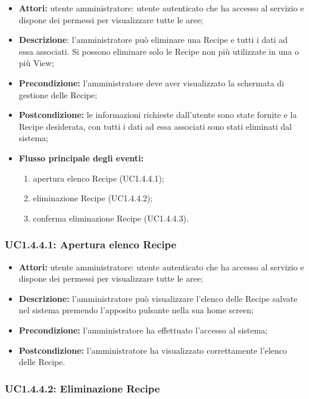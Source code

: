 \begin{itemize}
  	\item \textbf{Attori:} utente amministratore: utente autenticato che ha accesso al servizio e dispone dei permessi per visualizzare tutte le aree;
    \item \textbf{Descrizione}: l'amministratore può eliminare una Recipe e tutti i dati ad essa associati.
    Si possono eliminare solo le Recipe non più utilizzate in una o più View;
    \item \textbf{Precondizione:} l'amministratore deve aver visualizzato la schermata di gestione delle Recipe;
    \item \textbf{Postcondizione:} le informazioni richieste dall'utente sono state fornite e la Recipe desiderata, con tutti i dati ad essa associati sono stati eliminati dal sistema;
    \item \textbf{Flusso principale degli eventi:}
    \begin{enumerate}
        \item apertura elenco Recipe (UC1.4.4.1);
        \item eliminazione Recipe (UC1.4.4.2);
        \item conferma eliminazione Recipe (UC1.4.4.3).
    \end{enumerate}
\end{itemize}

\subsubsection{UC1.4.4.1: Apertura elenco Recipe}

\begin{itemize}
  	\item \textbf{Attori:} utente amministratore: utente autenticato che ha accesso al servizio e dispone dei permessi per visualizzare tutte le aree;
    \item \textbf{Descrizione:} l'amministratore può visualizzare l'elenco delle Recipe salvate nel sistema premendo l'apposito pulsante nella sua home screen;
    \item \textbf{Precondizione:} l'amministratore ha effettuato l'accesso al sistema;
    \item \textbf{Postcondizione:} l'amministratore ha visualizzato correttamente l'elenco delle Recipe.
\end{itemize}

\subsubsection{UC1.4.4.2: Eliminazione Recipe}

